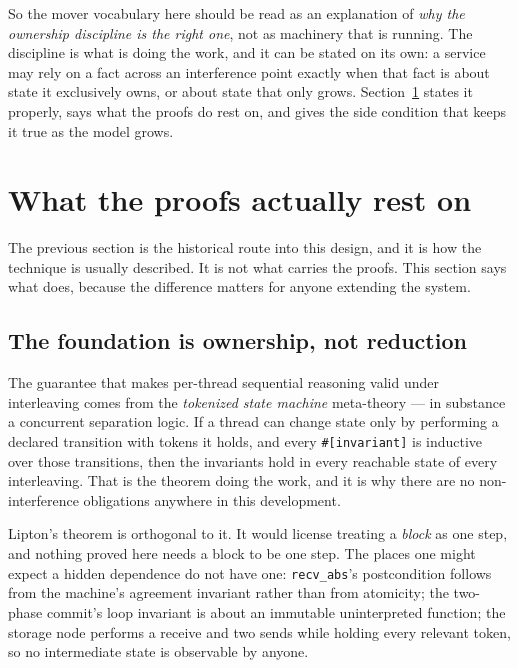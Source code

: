 \documentclass[11pt]{article}
\newcommand{\code}[1]{\texttt{#1}}
\begin{document}
So the mover vocabulary here should be read as an explanation of \emph{why the
ownership discipline is the right one}, not as machinery that is running. The
discipline is what is doing the work, and it can be stated on its own: a service
may rely on a fact across an interference point exactly when that fact is about
state it exclusively owns, or about state that only grows.
Section~\ref{sec:rests} states it properly, says what the proofs do rest on, and
gives the side condition that keeps it true as the model grows.

\section{What the proofs actually rest on}\label{sec:rests}

The previous section is the historical route into this design, and it is how the
technique is usually described. It is not what carries the proofs. This section
says what does, because the difference matters for anyone extending the system.

\subsection*{The foundation is ownership, not reduction}

The guarantee that makes per-thread sequential reasoning valid under
interleaving comes from the \emph{tokenized state machine} meta-theory --- in
substance a concurrent separation logic. If a thread can change state only by
performing a declared transition with tokens it holds, and every
\code{\#[invariant]} is inductive over those transitions, then the invariants
hold in every reachable state of every interleaving. That is the theorem doing
the work, and it is why there are no non-interference obligations anywhere in
this development.

Lipton's theorem is orthogonal to it. It would license treating a \emph{block}
as one step, and nothing proved here needs a block to be one step. The places
one might expect a hidden dependence do not have one: \code{recv\_abs}'s
postcondition follows from the machine's agreement invariant rather than from
atomicity; the two-phase commit's loop invariant is about an immutable
uninterpreted function; the storage node performs a receive and two sends while
holding every relevant token, so no intermediate state is observable by anyone.
\end{document}

